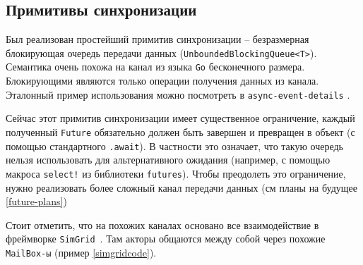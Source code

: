 \subsection{Примитивы синхронизации}\label{blockingqueue}

Был реализован простейший примитив синхронизации -- безразмерная блокирующая очередь передачи данных (\texttt{UnboundedBlockingQueue<T>}). Семантика очень похожа на канал из языка \texttt{Go} бесконечного размера. Блокирующими являются только операции получения данных из канала. Эталонный пример использования можно посмотреть в \texttt{async-event-details} \cite{async-event-details-example}. 

Сейчас этот примитив синхронизации имеет существенное ограничение, каждый полученный \texttt{Future} обязательно должен быть завершен и превращен в объект (с помощью стандартного \texttt{.await}). В частности это означает, что такую очередь нельзя использовать для альтернативного ожидания (например, с помощью макроса \texttt{select!} из библиотеки \texttt{futures}\cite{rust-futures}). Чтобы преодолеть это ограничение, нужно реализовать более сложный канал передачи данных (см планы на будущее \ref{future-plans})

Стоит отметить, что на похожих каналах основано все взаимодействие в фреймворке \texttt{SimGrid}~\cite{simgrid-example}. Там акторы общаются между собой через похожие \texttt{MailBox-ы} (пример \ref{simgridcode}).


